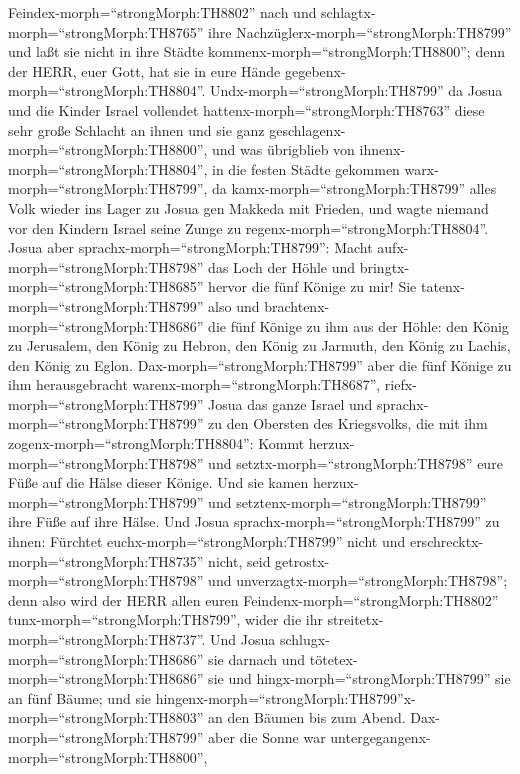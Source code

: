Feindex-morph=``strongMorph:TH8802'' nach und
schlagtx-morph=``strongMorph:TH8765'' ihre
Nachzüglerx-morph=``strongMorph:TH8799'' und laßt sie nicht in ihre
Städte kommenx-morph=``strongMorph:TH8800''; denn der HERR, euer Gott,
hat sie in eure Hände gegebenx-morph=``strongMorph:TH8804''.
 Undx-morph=``strongMorph:TH8799'' da Josua und die Kinder
Israel vollendet hattenx-morph=``strongMorph:TH8763'' diese sehr große
Schlacht an ihnen und sie ganz geschlagenx-morph=``strongMorph:TH8800'',
und was übrigblieb von ihnenx-morph=``strongMorph:TH8804'', in die
festen Städte gekommen warx-morph=``strongMorph:TH8799'', 
da kamx-morph=``strongMorph:TH8799'' alles Volk wieder ins Lager zu
Josua gen Makkeda mit Frieden, und wagte niemand vor den Kindern Israel
seine Zunge zu regenx-morph=``strongMorph:TH8804''.  Josua
aber sprachx-morph=``strongMorph:TH8799'': Macht
aufx-morph=``strongMorph:TH8798'' das Loch der Höhle und
bringtx-morph=``strongMorph:TH8685'' hervor die fünf Könige zu mir!
 Sie tatenx-morph=``strongMorph:TH8799'' also und
brachtenx-morph=``strongMorph:TH8686'' die fünf Könige zu ihm aus der
Höhle: den König zu Jerusalem, den König zu Hebron, den König zu
Jarmuth, den König zu Lachis, den König zu Eglon. 
Dax-morph=``strongMorph:TH8799'' aber die fünf Könige zu ihm
herausgebracht warenx-morph=``strongMorph:TH8687'',
riefx-morph=``strongMorph:TH8799'' Josua das ganze Israel und
sprachx-morph=``strongMorph:TH8799'' zu den Obersten des Kriegsvolks,
die mit ihm zogenx-morph=``strongMorph:TH8804'': Kommt
herzux-morph=``strongMorph:TH8798'' und
setztx-morph=``strongMorph:TH8798'' eure Füße auf die Hälse dieser
Könige. Und sie kamen herzux-morph=``strongMorph:TH8799'' und
setztenx-morph=``strongMorph:TH8799'' ihre Füße auf ihre Hälse.
 Und Josua sprachx-morph=``strongMorph:TH8799'' zu ihnen:
Fürchtet euchx-morph=``strongMorph:TH8799'' nicht und
erschrecktx-morph=``strongMorph:TH8735'' nicht, seid
getrostx-morph=``strongMorph:TH8798'' und
unverzagtx-morph=``strongMorph:TH8798''; denn also wird der HERR allen
euren Feindenx-morph=``strongMorph:TH8802''
tunx-morph=``strongMorph:TH8799'', wider die ihr
streitetx-morph=``strongMorph:TH8737''.  Und Josua
schlugx-morph=``strongMorph:TH8686'' sie darnach und
tötetex-morph=``strongMorph:TH8686'' sie und
hingx-morph=``strongMorph:TH8799'' sie an fünf Bäume; und sie
hingenx-morph=``strongMorph:TH8799''x-morph=``strongMorph:TH8803'' an
den Bäumen bis zum Abend.  Dax-morph=``strongMorph:TH8799''
aber die Sonne war untergegangenx-morph=``strongMorph:TH8800'',
